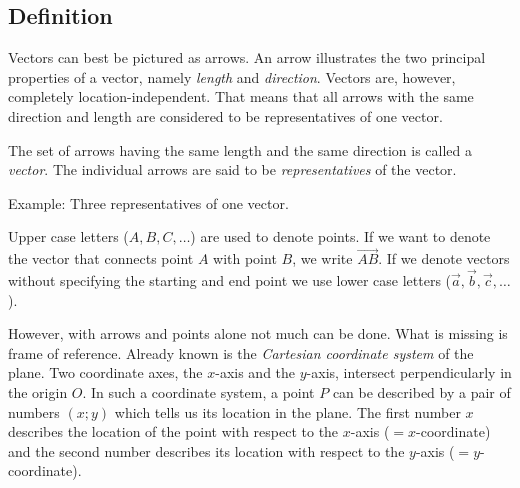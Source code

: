 \documentclass[12pt,eng]{skript_ogg}
\begin{document}
\subsection{Definition}
Vectors can best be pictured as arrows. An arrow illustrates the two principal properties of a vector, namely \emph{length} and \emph{direction}. Vectors are, however, completely location-independent. That means that all arrows with the same direction and length are considered to be representatives of one vector.
\begin{defn}[Vector]
The set of arrows having the same length and the same direction is called a \emph{vector}. The individual arrows are said to be \emph{representatives} of the vector.

Example: Three representatives of one vector. 
\end{defn}
Upper case letters ($A,B,C,\ldots$) are used to denote points. If we want to denote
the vector that connects point $A$ with point $B$, we write $\overrightarrow{AB}$. If we denote vectors without specifying the starting and end point we use lower case letters ($\vec{a},\vec{b},\vec{c},\ldots$).
\begin{center}
\end{center}
However, with arrows and points alone not much can be done. What is missing is frame of reference. Already known is the \emph{Cartesian coordinate system} of the plane. Two coordinate axes, the $x$-axis and the $y$-axis, intersect perpendicularly in the origin $O$. In such a coordinate system, a point $P$ can be described by a pair of numbers $(x;y)$ which tells us its location in the plane. The first number $x$ describes the location of the point with respect to the $x$-axis ($=x$-coordinate) and the second number describes its location with respect to the $y$-axis ($=y$-coordinate).
\end{document}
